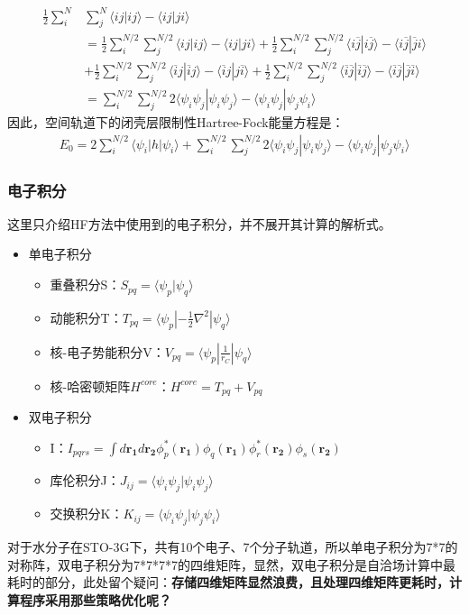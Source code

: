 \documentclass[12pt, a4paper, oneside]{ctexart}
\begin{document}
\begin{equation}
\begin{aligned}
\frac12\sum_i^N&\sum_j^N\langle ij|ij\rangle-\langle ij|ji\rangle\\
&=\frac12\sum_i^{N/2}\sum_j^{N/2}\langle ij|ij\rangle-\langle ij|ji\rangle+\frac12\sum_i^{N/2}\sum_j^{N/2}\langle i\overline{j}|i\overline{j}\rangle-\langle i\overline{j}|\overline{j}i\rangle\\
&+\frac12\sum_i^{N/2}\sum_j^{N/2}\langle \overline{i}j|\overline{i}j\rangle-\langle \overline{i}j|j\overline{i}\rangle+\frac12\sum_i^{N/2}\sum_j^{N/2}\langle \overline{i}\overline{j}|\overline{i}\overline{j}\rangle-\langle \overline{i}\overline{j}|\overline{j}\overline{i}\rangle\\
&=\sum_i^{N/2}\sum_j^{N/2}2\langle\psi_i\psi_j|\psi_i\psi_j\rangle-\langle\psi_i\psi_j|\psi_j\psi_i\rangle
\end{aligned}
\end{equation}
因此，空间轨道下的闭壳层限制性Hartree-Fock能量方程是：
\begin{equation}
\begin{aligned}
E_0=2\sum_i^{N/2}\langle\psi_i|h|\psi_i\rangle+\sum_i^{N/2}\sum_j^{N/2}2\langle\psi_i\psi_j|\psi_i\psi_j\rangle-\langle\psi_i\psi_j|\psi_j\psi_i\rangle
\end{aligned}
\end{equation}

\subsubsection{电子积分}
  这里只介绍HF方法中使用到的电子积分，并不展开其计算的解析式。
\begin{itemize}
  \item 单电子积分
  \begin{itemize}
    \item 重叠积分S：$S_{pq}=\langle\psi_p|\psi_q\rangle$
    \item 动能积分T：$T_{pq}=\langle\psi_p|-\frac{1}{2}\nabla^2|\psi_q\rangle$
    \item 核-电子势能积分V：$V_{pq}=\langle\psi_p|\frac{1}{r_C}|\psi_q\rangle$
	\item 核-哈密顿矩阵$H^{core}$：$H^{core}=T_{pq}+V_{pq}$
  \end{itemize}
  \item 双电子积分
\begin{itemize}
\item I：$I_{pqrs} = \int d\mathbf{r_1} d\mathbf{r_2} \phi_p^*(\mathbf{r_1}) \phi_q(\mathbf{r_1}) \phi_r^*(\mathbf{r_2}) \phi_s(\mathbf{r_2})$
  \item 库伦积分J：$J_{ij}=\langle\psi_i\psi_j|\psi_i\psi_j\rangle$
  \item 交换积分K：$K_{ij}=\langle\psi_i\psi_j|\psi_j\psi_i\rangle$
\end{itemize}
\end{itemize}
对于水分子在STO-3G下，共有10个电子、7个分子轨道，所以单电子积分为7*7的对称阵，双电子积分为7*7*7*7的四维矩阵，显然，双电子积分是自洽场计算中最耗时的部分，此处留个疑问：\textbf{存储四维矩阵显然浪费，且处理四维矩阵更耗时，计算程序采用那些策略优化呢？}
\end{document}
